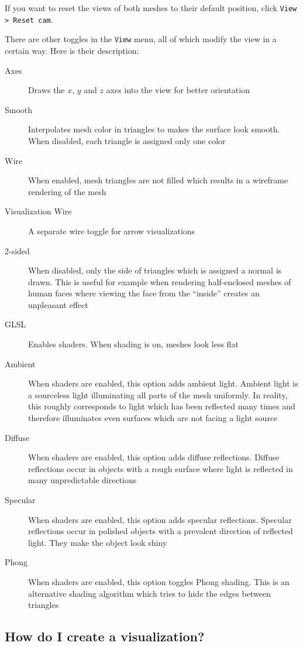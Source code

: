 If you want to reset the views of both meshes to their default position, click \verb+View > Reset cam+.

There are other toggles in the \verb+View+ menu, all of which modify the view in a certain way. Here is their description:

\begin{description}
\item [Axes] Draws the \(x\), \(y\) and \(z\) axes into the view for better orientation
\item [Smooth] Interpolates mesh color in triangles to makes the surface look smooth. When disabled, each triangle is assigned only one color
\item [Wire] When enabled, mesh triangles are not filled which results in a wireframe rendering of the mesh
\item [Visualization Wire] A separate wire toggle for arrow visualizations
\item [2-sided] When disabled, only the side of triangles which is assigned a normal is drawn. This is useful for example when rendering half-enclosed meshes of human faces where viewing the face from the ``inside'' creates an unpleasant effect
\item [GLSL] Enables shaders. When shading is on, meshes look less flat
\item [Ambient] When shaders are enabled, this option adds ambient light. Ambient light is a sourceless light illuminating all parts of the mesh uniformly. In reality, this roughly corresponds to light which has been reflected many times and therefore illuminates even surfaces which are not facing a light source 
\item [Diffuse] When shaders are enabled, this option adds diffuse reflections. Diffuse reflections occur in objects with a rough surface where light is reflected in many unpredictable directions
\item [Specular] When shaders are enabled, this option adds specular reflections. Specular reflections occur in polished objects with a prevalent direction of reflected light. They make the object look shiny
\item [Phong] When shaders are enabled, this option toggles Phong shading. This is an alternative shading algorithm which tries to hide the edges between triangles
\end{description}

\subsection{How do I create a visualization?}
\label{attch:user_doc-create_vis}

